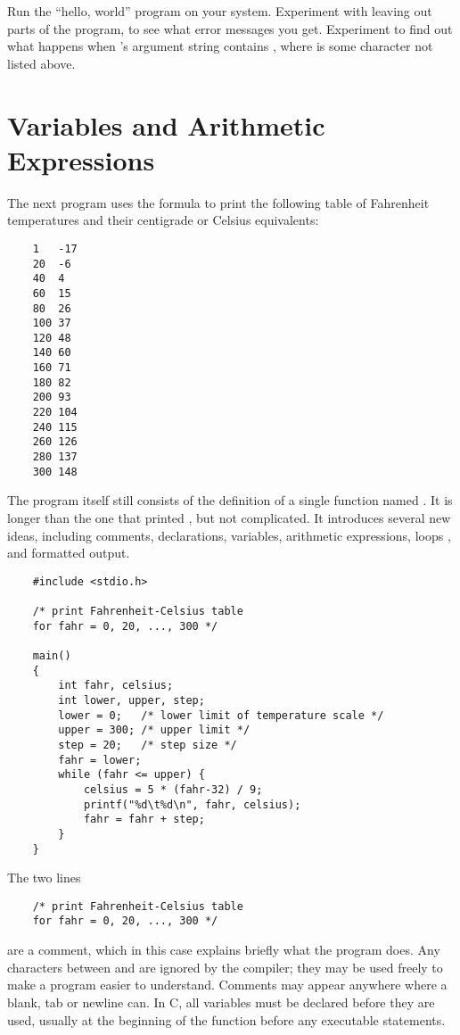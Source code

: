 \begin{ExerciseList}
\Exercise Run the ``hello, world'' program on your system. Experiment with leaving out parts of the program, to see what error messages you get.
\Exercise Experiment to find out what happens when 's argument string contains , where  is some character not listed above.
\end{ExerciseList}



\section{Variables and Arithmetic Expressions}


The next program uses the formula  to print the following table of Fahrenheit temperatures and their centigrade or Celsius equivalents:
\begin{lstlisting}
	1 	-17
	20 	-6
	40 	4
	60 	15
	80 	26
	100 37
	120 48
	140 60
	160 71
	180 82
	200 93
	220 104
	240 115
	260 126
	280 137
	300 148
\end{lstlisting}
The program itself still consists of the definition of a single function named .
It is longer than the one that printed , but not complicated.
It introduces several new ideas, including comments, declarations, variables, arithmetic expressions, loops , and formatted output.
\begin{lstlisting}
	#include <stdio.h>

	/* print Fahrenheit-Celsius table
	for fahr = 0, 20, ..., 300 */

	main()
	{
		int fahr, celsius;
		int lower, upper, step;
		lower = 0; 	 /* lower limit of temperature scale */
		upper = 300; /* upper limit */
		step = 20; 	 /* step size */
		fahr = lower;
		while (fahr <= upper) {
			celsius = 5 * (fahr-32) / 9;
			printf("%d\t%d\n", fahr, celsius);
			fahr = fahr + step;
		}
	}
\end{lstlisting}
The two lines
\begin{lstlisting}
	/* print Fahrenheit-Celsius table
	for fahr = 0, 20, ..., 300 */
\end{lstlisting}
are a comment, which in this case explains briefly what the program does.
Any characters between \code{/*} and \code{*/} are ignored by the compiler; they may be used freely to make a program easier to understand.
Comments may appear anywhere where a blank, tab or newline can.
In C, all variables must be declared before they are used, usually at the beginning of the function before any executable statements.
